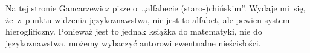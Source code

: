 \documentclass[a4paper,11pt]{article}
\begin{document}
\vspace{\spaceFour}





 Na tej stronie Gancarzewicz pisze o~,,alfabecie (staro-)chińskim''. Wydaje
mi~się, że~z~punktu widzenia językoznawstwa, nie jest to alfabet, ale pewien system
hieroglificzny. Ponieważ jest to jednak książka do matematyki, nie do językoznawstwa,
możemy wybaczyć autorowi ewentualne nieścisłości.

\vspace{\spaceFour}

















\newpage


\vspace{\spaceFive}
\end{document}
